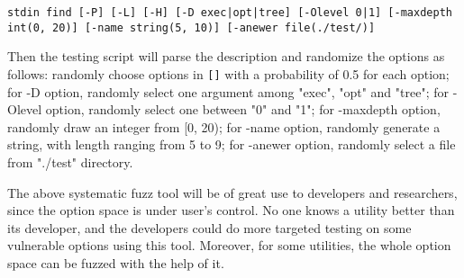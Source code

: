 \texttt{stdin find [-P] [-L] [-H] [-D exec|opt|tree] [-Olevel 0|1] [-maxdepth int(0, 20)] [-name string(5, 10)] [-anewer file(./test/)]}

Then the testing script will parse the description and randomize the options as follows: randomly choose options in \texttt{[]} with a probability of 0.5 for each option; for -D option, randomly select one argument among "exec", "opt" and "tree"; for -Olevel option, randomly select one between "0" and "1"; for -maxdepth option, randomly draw an integer from [0, 20); for -name option, randomly generate a string, with length ranging from 5 to 9; for -anewer option, randomly select a file from "./test" directory.

The above systematic fuzz tool will be of great use to developers and researchers, since the option space is under user's control. No one knows a utility better than its developer, and the developers could do more targeted testing on some vulnerable options using this tool. Moreover, for some utilities, the whole option space can be fuzzed with the help of it.